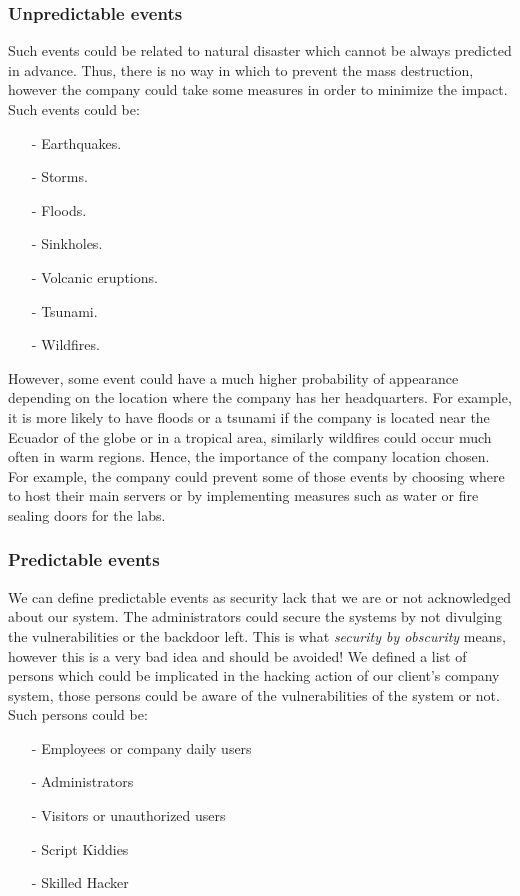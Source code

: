 \documentclass[a4paper,10pt]{article}
\begin{document}
\subsubsection{Unpredictable events}
Such events could be related to natural disaster which cannot be always predicted in advance. Thus, there is no way in which to prevent the mass destruction, however the company could take some measures in order to minimize the impact. Such events could be:
\begin{enumerate}
\item[-] Earthquakes.
\item[-] Storms.
\item[-] Floods.
\item[-] Sinkholes.
\item[-] Volcanic eruptions.
\item[-] Tsunami.
\item[-] Wildfires.
\end{enumerate}
However, some event could have a much higher probability of appearance depending on the location where the company has her headquarters. For example, it is more likely to have floods or a tsunami if the company is located near the Ecuador of the globe or in a tropical area, similarly wildfires could occur much often in warm regions. Hence, the importance of the company location chosen. For example, the company could prevent some of those events by choosing where to host their main servers or by implementing measures such as water or fire sealing doors for the labs.

\subsubsection{Predictable events}
We can define predictable events as security lack that we are or not acknowledged about our system. The administrators could secure the systems by not divulging the vulnerabilities or the backdoor left. This is what \emph{security by obscurity} means, however this is a very bad idea and should be avoided! We defined a list of persons which could be implicated in the hacking action of our client's company system, those persons could be aware of the vulnerabilities of the system or not. Such persons could be:
\begin{enumerate}
\item[-] Employees or company daily users
\item[-] Administrators
\item[-] Visitors or unauthorized users
\item[-] Script Kiddies
\item[-] Skilled Hacker
\end{enumerate}
\end{document}
